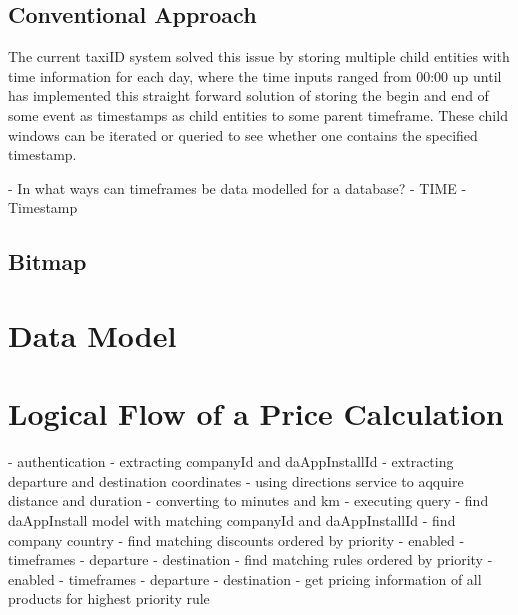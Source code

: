 \subsection{Conventional Approach}
The current taxiID system solved this issue by storing multiple child entities with time information for each day, where the time inputs ranged from 00:00 up until
has implemented this straight forward solution of storing the begin and end  of some event as timestamps as child entities to some parent timeframe. These child windows can be iterated or queried to see whether one contains the specified timestamp.

- In what ways can timeframes be data modelled for a database?
	- TIME
	- Timestamp

\subsection{Bitmap}

%
\section{Data Model}


%
\section{Logical Flow of a Price Calculation}

- authentication
- extracting companyId and daAppInstallId
- extracting departure and destination coordinates
- using directions service to aqquire distance and duration
	- converting to minutes and km
- executing query
	- find daAppInstall model with matching companyId and daAppInstallId
	- find company country
	- find matching discounts ordered by priority
	  - enabled
		- timeframes
		- departure
		- destination
	- find matching rules ordered by priority
	  - enabled
		- timeframes
		- departure
		- destination
	- get pricing information of all products for highest priority rule













